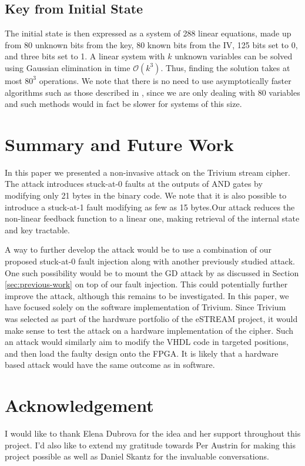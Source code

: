 \documentclass[conference]{IEEEtran}
\begin{document}
\subsection{Key from Initial State}

The initial state is then expressed as a system of 288 linear equations, made up from 80 unknown bits from the key, 80 known bits from the IV, 125 bits set to 0, and three bits set to 1. A linear system with $k$ unknown variables can be solved using Gaussian elimination in time $\mathcal{O}(k^3)$. Thus, finding the solution takes at most $80^{3}$ operations. We note that there is no need to use asymptotically faster algorithms such as those described in \cite{gauss}, since we are only dealing with 80 variables and such methods would in fact be slower for systems of this size.
 
\section{Summary and Future Work}

In this paper we presented a non-invasive attack on the Trivium stream cipher. The attack introduces stuck-at-0 faults at the outputs of AND gates by modifying only 21 bytes in the binary code. We note that it is also possible to introduce a stuck-at-1 fault modifying as few as 15 bytes.Our attack reduces the non-linear feedback function to a linear one, making retrieval of the internal state and key tractable.

A way to further develop the attack would be to use a combination of our proposed stuck-at-0 fault injection along with another previously studied attack. One such possibility would be to mount the GD attack by \cite{Rohani2010} as discussed in Section \ref{sec:previous-work} on top of our fault injection. This could potentially further improve the attack, although this remains to be investigated. In this paper, we have focused solely on the software implementation of Trivium. Since Trivium was selected as part of the hardware portfolio of the eSTREAM project, it would make sense to test the attack on a hardware implementation of the cipher. Such an attack would similarly aim to modify the VHDL code in targeted positions, and then load the faulty design onto the FPGA. It is likely that a hardware based attack would have the same outcome as in software.

\section*{Acknowledgement}

I would like to thank Elena Dubrova for the idea and her support throughout this project. I'd also like to extend my gratitude towards Per Austrin for making this project possible as well as Daniel Skantz for the invaluable conversations.



\nocite{*}
\end{document}
